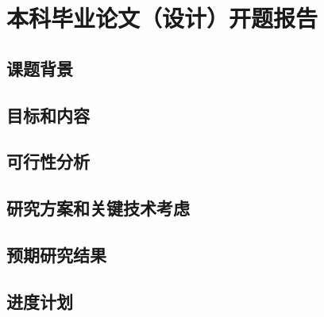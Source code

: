\chapter{本科毕业论文（设计）开题报告}

\section{课题背景}

\section{目标和内容}

\section{可行性分析}

\section{研究方案和关键技术考虑}

\section{预期研究结果}

\section{进度计划}